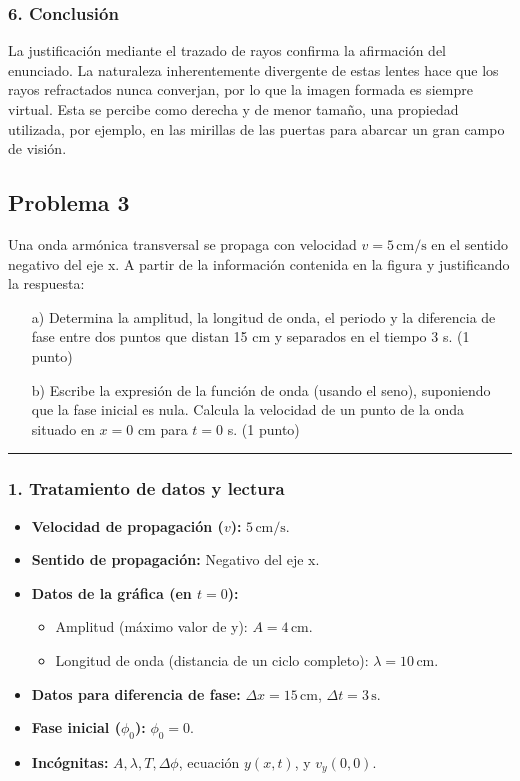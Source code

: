 \subsubsection*{6. Conclusión}
\begin{cajaconclusion}
La justificación mediante el trazado de rayos confirma la afirmación del enunciado. La naturaleza inherentemente divergente de estas lentes hace que los rayos refractados nunca converjan, por lo que la imagen formada es siempre virtual. Esta se percibe como derecha y de menor tamaño, una propiedad utilizada, por ejemplo, en las mirillas de las puertas para abarcar un gran campo de visión.
\end{cajaconclusion}

\newpage

\subsection{Problema 3}
\label{subsec:P3_2020_sep_ext}

\begin{cajaenunciado}
Una onda armónica transversal se propaga con velocidad $v=5\,\text{cm/s}$ en el sentido negativo del eje x. A partir de la información contenida en la figura y justificando la respuesta:
\begin{enumerate}
    \item[a)] Determina la amplitud, la longitud de onda, el periodo y la diferencia de fase entre dos puntos que distan 15 cm y separados en el tiempo 3 s. (1 punto)
    \item[b)] Escribe la expresión de la función de onda (usando el seno), suponiendo que la fase inicial es nula. Calcula la velocidad de un punto de la onda situado en $x=0$ cm para $t=0$ s. (1 punto)
\end{enumerate}
\end{cajaenunciado}
\hrule

\subsubsection*{1. Tratamiento de datos y lectura}
\begin{itemize}
    \item \textbf{Velocidad de propagación ($v$):} $5\,\text{cm/s}$.
    \item \textbf{Sentido de propagación:} Negativo del eje x.
    \item \textbf{Datos de la gráfica (en $t=0$):}
    \begin{itemize}
        \item Amplitud (máximo valor de y): $A = 4\,\text{cm}$.
        \item Longitud de onda (distancia de un ciclo completo): $\lambda = 10\,\text{cm}$.
    \end{itemize}
    \item \textbf{Datos para diferencia de fase:} $\Delta x = 15\,\text{cm}$, $\Delta t = 3\,\text{s}$.
    \item \textbf{Fase inicial ($\phi_0$):} $\phi_0 = 0$.
    \item \textbf{Incógnitas:} $A, \lambda, T, \Delta\phi$, ecuación $y(x,t)$, y $v_y(0,0)$.
\end{itemize}

